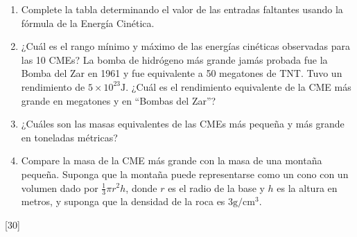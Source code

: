 \documentclass[a4paper]{article}
\newcommand{\cm}{\text{cm}}
\newcommand{\g}{\text{g}}
\newcommand{\J}{\text{J}}
\newcounter{problema}
\begin{document}
\begin{problema}
\begin{enumerate}
	\item Complete la tabla determinando el valor de las entradas faltantes usando la fórmula de la Energía Cinética.

	\item ¿Cuál es el rango mínimo y máximo de las energías cinéticas observadas para las 10 CMEs? La bomba de hidrógeno más grande jamás probada fue la Bomba del Zar en 1961 y fue equivalente a 50 megatones de TNT. Tuvo un rendimiento de $ 5 \times 10^{23} \J$. ¿Cuál es el rendimiento equivalente de la CME más grande en megatones y en “Bombas del Zar”?

	\item ¿Cuáles son las masas equivalentes de las CMEs más pequeña y más grande en toneladas métricas?

	\item Compare la masa de la CME más grande con la masa de una montaña pequeña. Suponga que la montaña puede representarse como un cono con un volumen dado por $\frac{1}{3} \pi r^2 h $, donde $r$ es el radio de la base y $h$ es la altura en metros, y suponga que la densidad de la roca es $3 \g / \cm ^3$.
\end{enumerate}

\end{problema}
[30] \cite{NASA_SpaceWeatherMath}


\end{document}
